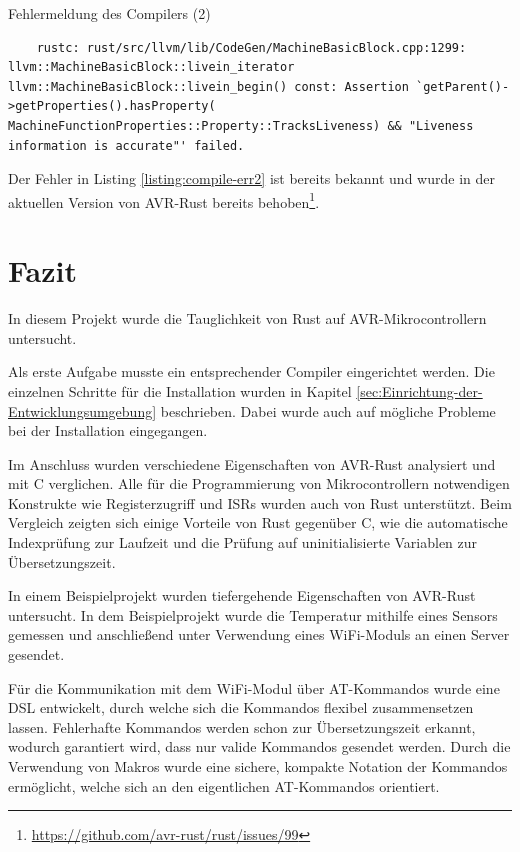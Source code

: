\documentclass
[ 12pt,
  parskip=half %
]{scrreprt}
\newenvironment{mylisting}[1][H]
{\captionsetup{aboveskip=-0.2\normalbaselineskip}\begin{listing}[#1]}
{\end{listing}}
\begin{document}
\begin{mylisting}
	\caption{Fehlermeldung des Compilers (2)}
	\label{listing:compile-err2}
	\begin{verbatim}
	rustc: rust/src/llvm/lib/CodeGen/MachineBasicBlock.cpp:1299: llvm::MachineBasicBlock::livein_iterator llvm::MachineBasicBlock::livein_begin() const: Assertion `getParent()->getProperties().hasProperty( MachineFunctionProperties::Property::TracksLiveness) && "Liveness information is accurate"' failed.
	\end{verbatim}
\end{mylisting} 

Der Fehler in Listing \ref{listing:compile-err2} ist bereits bekannt und wurde in der aktuellen Version von AVR-Rust bereits behoben\footnote{ \url{https://github.com/avr-rust/rust/issues/99}}.

\chapter{Fazit}

In diesem Projekt wurde die Tauglichkeit von Rust auf AVR-Mikrocontrollern untersucht. 

Als erste Aufgabe musste ein entsprechender Compiler eingerichtet werden. Die einzelnen Schritte für die Installation wurden in Kapitel \ref{sec:Einrichtung-der-Entwicklungsumgebung} beschrieben. Dabei wurde auch auf mögliche Probleme bei der Installation eingegangen.

Im Anschluss wurden verschiedene Eigenschaften von AVR-Rust analysiert und mit C verglichen. Alle für die Programmierung von Mikrocontrollern notwendigen Konstrukte wie Registerzugriff und ISRs wurden auch von Rust unterstützt. Beim Vergleich zeigten sich einige Vorteile von Rust gegenüber C, wie die automatische Indexprüfung zur Laufzeit und die Prüfung auf uninitialisierte Variablen zur Übersetzungszeit.  

In einem Beispielprojekt wurden tiefergehende Eigenschaften von AVR-Rust untersucht. In dem Beispielprojekt wurde die Temperatur mithilfe eines Sensors gemessen und anschließend unter Verwendung eines WiFi-Moduls an einen Server gesendet. 

Für die Kommunikation mit dem WiFi-Modul über AT-Kommandos wurde eine DSL entwickelt, durch welche sich die Kommandos flexibel zusammensetzen lassen. Fehlerhafte Kommandos werden schon zur Übersetzungszeit erkannt, wodurch garantiert wird, dass nur valide Kommandos gesendet werden. Durch die Verwendung von Makros wurde eine sichere, kompakte Notation der Kommandos ermöglicht, welche sich an den eigentlichen AT-Kommandos orientiert.
\end{document}
